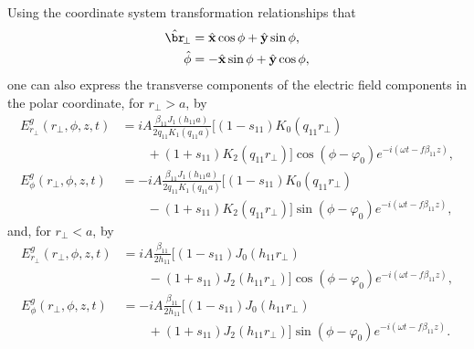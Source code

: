 \documentclass[]{report}
\begin{document}
Using the coordinate system transformation relationships that
\begin{align}
\hat{\br}\!_\perp &= \hat{\mathbf{x}}\cos\phi + \hat{\mathbf{y}}\sin\phi,\\
\hat{\phi} &= -\hat{\mathbf{x}}\sin\phi + \hat{\mathbf{y}}\cos\phi,
\end{align}
one can also express the transverse components of the electric field components in the polar coordinate, for $ r\!_\perp>a $, by
\begin{subequations}
\label{Erptlrga}
\begin{align}
E_{r\!_\perp}^g(r_\perp,\phi,z,t) &= iA \frac{\beta_{11}J_1(h_{11}a)}{2q_{11}K_1(q_{11}a)}[(1-s_{11})K_0(q_{11}r_\perp) \nonumber\\
&\qquad + (1+s_{11})K_2 (q_{11}r_\perp) ]\cos (\phi-\varphi_0) e^{-i(\omega t-f\beta_{11}z)},\\
E_\phi^g(r_\perp,\phi,z,t) &= -iA \frac{\beta_{11}J_1(h_{11}a)}{2q_{11}K_1(q_{11}a)}[(1-s_{11})K_0(q_{11}r_\perp) \nonumber\\
&\qquad - (1+s_{11})K_2 (q_{11}r_\perp) ]\sin (\phi-\varphi_0) e^{-i(\omega t-f\beta_{11}z)},
\end{align}
\end{subequations}
and, for $ r_\perp<a $, by
\begin{subequations}
\label{Ephirtlrla}
\begin{align}
E_{r\!_\perp}^g(r_\perp,\phi,z,t) &= iA \frac{\beta_{11}}{2h_{11}}[(1-s_{11})J_0(h_{11}r_\perp) \nonumber\\
&\qquad - (1+s_{11})J_2 (h_{11}r_\perp)  ]\cos (\phi-\varphi_0) e^{-i(\omega t-f\beta_{11}z)},\\
E_\phi^g(r_\perp,\phi,z,t) &= -iA \frac{\beta_{11}}{2h_{11}}[(1-s_{11})J_0(h_{11}r_\perp) \nonumber\\
&\qquad + (1+s_{11})J_2 (h_{11}r_\perp)  ]\sin (\phi-\varphi_0) e^{-i(\omega t-f\beta_{11}z)}.
\end{align}
\end{subequations}
\end{document}
